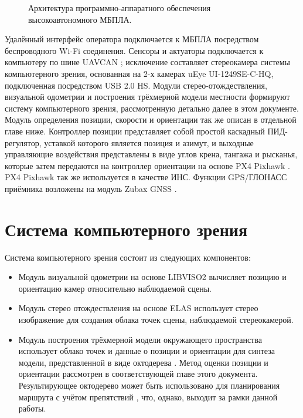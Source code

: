 \documentclass[11pt,a4paper]{article}
\begin{document}
\begin{figure}[!htbp]
    \centering
    
    \caption{\label{fig:arch}Архитектура программно-аппаратного обеспечения высокоавтономного МБПЛА.}
\end{figure}

Удалённый интерфейс оператора подключается к МБПЛА посредством беспроводного Wi-Fi соединения. Сенсоры и актуаторы подключается к компьютеру по шине UAVCAN \cite{UAVCAN}; исключение составляет стереокамера системы компьютерного зрения, основанная на 2-х камерах uEye UI-1249SE-C-HQ, подключенная посредством USB 2.0 HS. Модули стерео-отождествления, визуальной одометрии и построения трёхмерной модели местности формируют систему компьютерного зрения, рассмотренную детально далее в этом документе. Модуль определения позиции, скорости и ориентации так же описан в отдельной главе ниже. Контроллер позиции представляет собой простой каскадный ПИД-регулятор, уставкой которого является позиция и азимут, и выходные управляющие воздействия представлены в виде углов крена, тангажа и рысканья, которые затем передаются на контроллер ориентации на основе PX4 Pixhawk \cite{Pixhawk}. PX4 Pixhawk так же используется в качестве ИНС. Функции GPS/ГЛОНАСС приёмника возложены на модуль Zubax GNSS \cite{ZubaxGNSS}.

\newpage

\section{Система компьютерного зрения}

Система компьютерного зрения состоит из следующих компонентов:

\begin{itemize}
    \item Модуль визуальной одометрии на основе LIBVISO2 \cite{Geiger2011IV} вычисляет позицию и ориентацию камер относительно наблюдаемой сцены.
    \item Модуль стерео отождествления на основе ELAS \cite{Geiger10} использует стерео изображение для создания облака точек сцены, наблюдаемой стереокамерой.
    \item Модуль построения трёхмерной модели окружающего пространства использует облако точек и данные о позиции и ориентации для синтеза модели, представленной в виде октодерева \cite{rensselaer1980octree}. Метод оценки позиции и ориентации рассмотрен в соответствующей главе этого документа. Результирующее октодерево может быть использовано для планирования маршрута с учётом препятствий \cite{FraundorferHHLMTP12}, что, однако, выходит за рамки данной работы.
\end{itemize}
\end{document}
